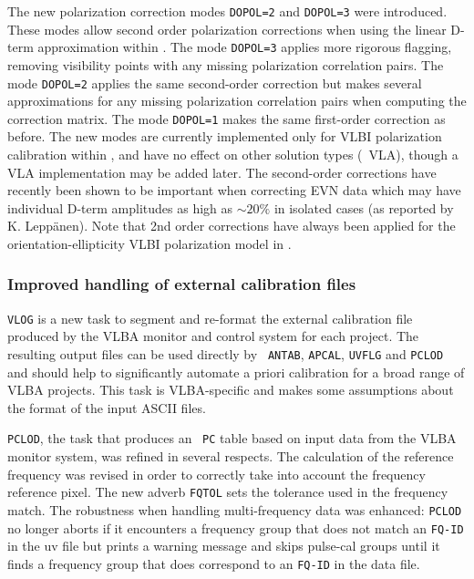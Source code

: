 The new polarization correction modes {\tt DOPOL=2} and {\tt DOPOL=3}
were introduced.  These modes allow second order polarization
corrections when using the linear D-term approximation within
\AIPS. The mode {\tt DOPOL=3} applies more rigorous flagging, removing
visibility points with any missing polarization correlation pairs. The
mode {\tt DOPOL=2} applies the same second-order correction but makes
several approximations for any missing polarization correlation pairs
when computing the correction matrix. The mode {\tt DOPOL=1} makes the
same first-order correction as before.  The new modes are currently
implemented only for VLBI polarization calibration within \AIPS, and
have no effect on other solution types (\eg\ VLA), though a VLA
implementation may be added later.  The second-order corrections have
recently been shown to be important when correcting EVN data which may
have individual D-term amplitudes as high as $\sim 20\%$ in isolated
cases (as reported by K. Lepp\"anen). Note that 2nd order corrections
have always been applied for the orientation-ellipticity VLBI
polarization model in \AIPS.


\subsubsection{Improved handling of external calibration files}

{\tt VLOG} is a new task to segment and re-format the external
calibration file produced by the VLBA monitor and control system for
each project. The resulting output files can be used directly by {\tt
ANTAB}, {\tt APCAL}, {\tt UVFLG} and {\tt PCLOD} and should help to
significantly automate a priori calibration for a broad range of VLBA
projects. This task is VLBA-specific and makes some assumptions about
the format of the input ASCII files.

{\tt PCLOD}, the task that produces an \AIPS\ {\tt PC} table based on
input data from the VLBA monitor system, was refined in several
respects.  The calculation of the reference frequency was revised in
order to correctly take into account the frequency reference pixel.
The new adverb {\tt FQTOL} sets the tolerance used in the frequency
match.  The robustness when handling multi-frequency data was
enhanced: {\tt PCLOD} no longer aborts if it encounters a frequency
group that does not match an {\tt FQ-ID} in the uv file but prints a
warning message and skips pulse-cal groups until it finds a frequency
group that does correspond to an {\tt FQ-ID} in the data file.


